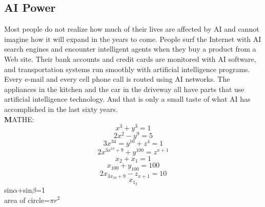 \documentclass[12pt]{article}
\begin{document}
   \subsection{AI Power}
   \large
    Most people do not realize how much of their lives are affected by AI and cannot imagine how it will expand in the years to come. People surf the Internet with AI search engines and encounter intelligent agents when they buy a product from a Web site. Their bank accounts and credit cards are monitored with AI software, and transportation systems run smoothly with artificial intelligence programs. Every e-mail and every cell phone call is routed using AI networks. The appliances in the kitchen and the car in the driveway all have parts that use artificial intelligence technology. And that is only a small taste of what AI has accomplished in the last sixty years. \\
\newpage
\huge
\center
\textbf
MATHE:\\
\large     
$$x^3+y^3=1$$ 
$$2x^2-y^9=5$$
$$3x^{34}=y^{10}+z^4=1$$
$$2x^{3x^{10}+9}+y^{100}=z^{x+1}$$
$$x_2+x_1=1$$
$$x_{100}+y_{100}=100$$
$$2x_{3x_{10}+9}-z_{x+1}=10$$
$$x_{1_2}$$
sin$\alpha$+sin$\beta$=1\\
area of circle=$\pi$$r^2$\\
\end{document}
